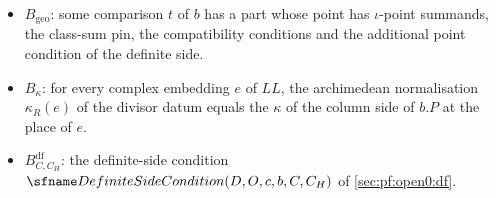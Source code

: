 \begin{definition}
\begin{itemize}
a family of monic squarefree polynomials over $\F_{g_k}$ of degree $r$ with the separation, avoidance, non-splitting and
large-irreducible-factor conditions with respect to the characters $\chi^T_k$ and their inverses.
\item $B_{\mathrm{geo}}$: some comparison $t$ of $b$ has a part whose point has $\iota$-point summands, the class-sum pin,
the compatibility conditions and the additional point condition of the definite side.
\item $B_\kappa$: for every complex embedding $e$ of $\mathit{LL}$, the archimedean normalisation $\kappa_R(e)$ of the
divisor datum equals the $\kappa$ of the column side of $b.P$ at the place of $e$.
\item $B^{\mathrm{df}}_{C,C_H}$: the definite-side condition $\openzeroDF(D,O,c,b,C,C_H)$ of \cref{sec:pf:open0:df}.
\end{itemize}
\ \
\ \ 
\end{definition}

